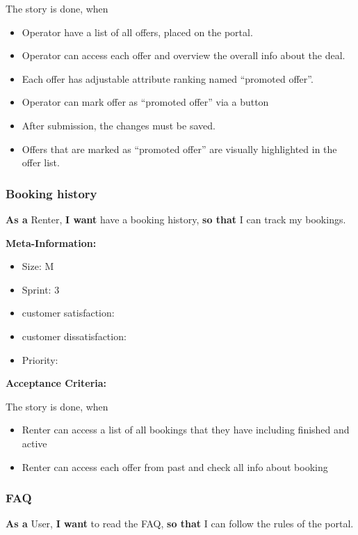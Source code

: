 The story is done, when
\begin{itemize}
    \item Operator have a list of all offers, placed on the portal.
    \item Operator can access each offer and overview the overall info about the deal.
    \item Each offer has adjustable attribute ranking named “promoted offer”.
    \item Operator can mark offer as “promoted offer” via a button
    \item After submission, the changes must be saved.
    \item Offers that are marked as “promoted offer” are visually highlighted in the offer list.
\end{itemize}

\subsubsection{Booking history}

\textbf{As a} Renter,\hfill\break
\textbf{I want} have a booking history,\hfill\break
\textbf{so that} I can track my bookings.

\textbf{Meta-Information:}
\begin{itemize}
    \item Size: M
    \item Sprint: 3
    \item customer satisfaction:
    \item customer dissatisfaction:
    \item Priority:
\end{itemize}

\textbf{Acceptance Criteria:}

The story is done, when
\begin{itemize}
    \item Renter can access a list of all bookings that they have including finished and active
    \item Renter can access each offer from past and check all info about booking
\end{itemize}

\subsubsection{FAQ}

\textbf{As a} User,\hfill\break
\textbf{I want} to read the FAQ,\hfill\break
\textbf{so that} I can follow the rules of the portal.

